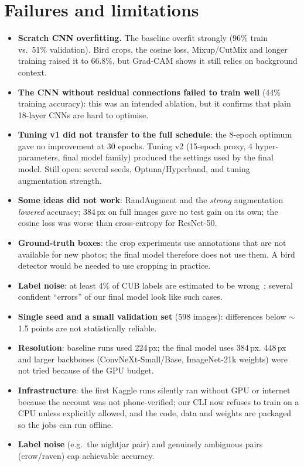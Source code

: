 \documentclass[11pt,a4paper]{article}
\begin{document}
\section{Failures and limitations}\label{sec:fail}
\begin{itemize}
\item \textbf{Scratch CNN overfitting.} The baseline overfit strongly (96\% train vs.\ 51\% validation). Bird crops, the cosine
loss, Mixup/CutMix and longer training raised it to 66.8\%, but Grad-CAM shows it still relies on background context.
\item \textbf{The CNN without residual connections failed to train well} (44\% training accuracy): this was an intended
ablation, but it confirms that plain 18-layer CNNs are hard to optimise.
\item \textbf{Tuning v1 did not transfer to the full schedule}: the 8-epoch optimum gave no improvement at 30 epochs. Tuning v2
(15-epoch proxy, 4 hyper-parameters, final model family) produced the settings used by the final model. Still open: several seeds,
Optuna/Hyperband, and tuning augmentation strength.
\item \textbf{Some ideas did not work}: RandAugment and the \emph{strong} augmentation \emph{lowered} accuracy; 384\,px on full
images gave no test gain on its own; the cosine loss was worse than cross-entropy for ResNet-50.
\item \textbf{Ground-truth boxes}: the crop experiments use annotations that are not available for new photos; the final model
therefore does not use them. A bird detector would be needed to use cropping in practice.
\item \textbf{Label noise}: at least 4\% of CUB labels are estimated to be wrong~\cite{vanhorn}; several confident ``errors'' of our
final model look like such cases.
\item \textbf{Single seed and a small validation set} (598 images): differences below $\sim$1.5 points are not statistically reliable.
\item \textbf{Resolution}: baseline runs used 224\,px; the final model uses 384\,px. 448\,px and larger backbones
(ConvNeXt-Small/Base, ImageNet-21k weights) were not tried because of the GPU budget.
\item \textbf{Infrastructure}: the first Kaggle runs silently ran without GPU or internet because the account was not phone-verified;
our CLI now refuses to train on a CPU unless explicitly allowed, and the code, data and weights are packaged so the jobs can run
offline.
\item \textbf{Label noise} (e.g.\ the nightjar pair) and genuinely ambiguous pairs (crow/raven) cap achievable accuracy.
\end{itemize}
\end{document}
